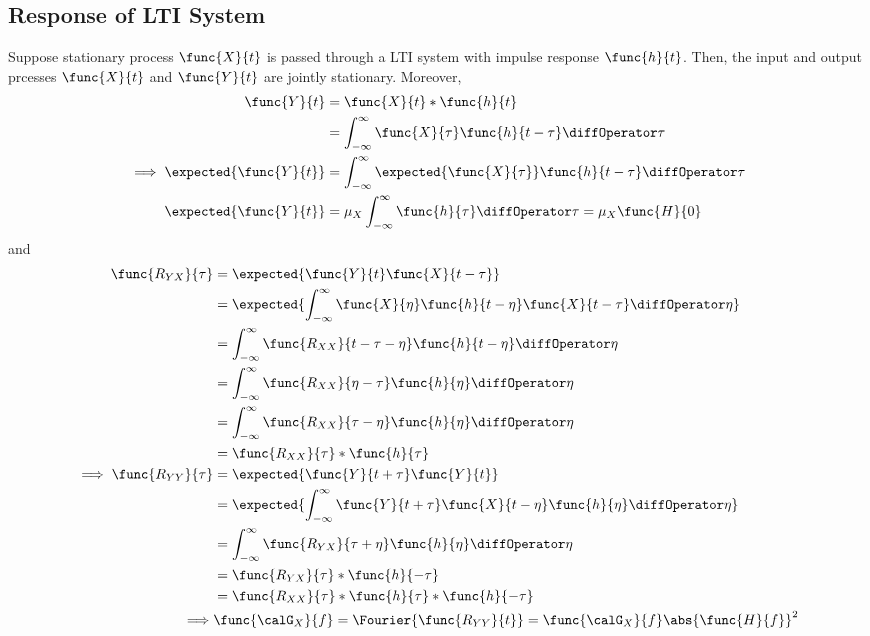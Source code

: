 \subsection{Response of LTI System}
Suppose stationary process \(\func{X}{t}\) is passed through a LTI system with impulse response \(\func{h}{t}\). Then, the input and output prcesses \(\func{X}{t}\) and \(\func{Y}{t}\) are jointly stationary. Moreover, 
\begin{align*}
    \func{Y}{t} &= \func{X}{t} \ast \func{h}{t}\\
    &= \int_{-\infty}^{\infty} \func{X}{\tau} \func{h}{t - \tau} \diffOperator \tau\\
    \implies  \expected{\func{Y}{t}} &= \int_{-\infty}^{\infty} \expected{\func{X}{\tau}} \func{h}{t - \tau} \diffOperator \tau\\
    \expected{\func{Y}{t}} &= \mu_X \int_{-\infty}^{\infty} \func{h}{\tau} \diffOperator \tau = \mu_X \func{H}{0}
\end{align*}
and 
\begin{align*}
    \func{R_{YX}}{\tau} &= \expected{\func{Y}{t} \func{X}{t - \tau}}\\
    & = \expected{\int_{-\infty}^{\infty} \func{X}{\eta} \func{h}{t - \eta} \func{X}{t - \tau} \diffOperator \eta }\\
    &= \int_{-\infty}^{\infty} \func{R_{XX}}{t - \tau - \eta } \func{h}{t - \eta}\diffOperator \eta \\
    &= \int_{-\infty}^{\infty} \func{R_{XX}}{ \eta - \tau } \func{h}{ \eta}\diffOperator \eta \\
    &= \int_{-\infty}^{\infty} \func{R_{XX}}{  \tau - \eta } \func{h}{ \eta}\diffOperator \eta \\
    &= \func{R_{XX}}{\tau} \ast \func{h}{\tau}\\
    \implies \func{R_{YY}}{\tau} &= \expected{\func{Y}{t + \tau} \func{Y}{t}}\\
    &=  \expected{\int_{-\infty}^{\infty} \func{Y}{t + \tau} \func{X}{t - \eta}\func{h}{\eta} \diffOperator \eta}\\
    &= \int_{-\infty}^{\infty} \func{R_{YX}}{\tau + \eta} \func{h}{\eta} \diffOperator \eta \\
    &= \func{R_{YX}}{\tau } \ast \func{h}{-\tau} \\
    &= \func{R_{XX}}{\tau} \ast \func{h}{\tau} \ast  \func{h}{-\tau}\\
    \implies & \func{\calG_X}{f} = \Fourier{\func{R_{YY}}{t}} = \func{\calG_X}{f} \abs{\func{H}{f}}^2
\end{align*}
